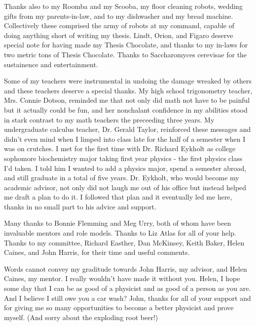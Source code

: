 Thanks also to my Roomba and my Scooba, my floor cleaning robots, wedding gifts from my parents-in-law, and to my dishwasher and my bread machine.  Collectively these comprised the army of robots at my command, capable of doing anything short of writing my thesis.  Lindt, Orion, and Figaro deserve special note for having made my Thesis Chocolate, and thanks to my in-laws for two metric tons of Thesis Chocolate.  Thanks to Saccharomyces cerevisae for the sustainence and entertainment.

Some of my teachers were instrumental in undoing the damage wreaked by others and these teachers deserve a special thanks.  My high school trigonometry teacher, Mrs. Connie Dotson, reminded me that not only did math not have to be painful but it actually could be fun, and her nonchalant confidence in my abilities stood in stark contrast to my math teachers the preceeding three years.  My undergraduate calculus teacher, Dr. Gerald Taylor, reinforced these messages and didn't even mind when I limped into class late for the half of a semester when I was on crutches.  I met for the first time with Dr. Richard Eykholt as college sophomore biochemistry major taking first year physics - the first physics class I'd taken.  I told him I wanted to add a physics major, spend a semester abroad, and still graduate in a total of five years.  Dr. Eykholt, who would become my academic advisor, not only did not laugh me out of his office but instead helped me draft a plan to do it.  I followed that plan and it eventually led me here, thanks in no small part to his advice and support.


Many thanks to Bonnie Flemming and Meg Urry, both of whom have been invaluable mentors and role models.  Thanks to Liz Atlas for all of your help.  Thanks to my committee, Richard Easther, Dan McKinsey, Keith Baker, Helen Caines, and John Harris, for their time and useful comments.

Words cannot convey my graditude towards John Harris, my advisor, and Helen Caines, my mentor.  I really wouldn't have made it without you.  Helen, I hope some day that I can be as good of a physicist and as good of a person as you are.  And I believe I still owe you a car wash?  John, thanks for all of your support and for giving me so many opportunities to become a better physicist and prove myself.  (And sorry about the exploding root beer!)
